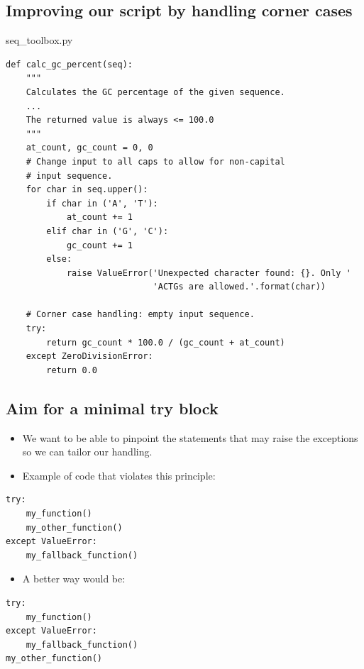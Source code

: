 \documentclass[aspectratio=1610,slidestop]{beamer}
\begin{document}
\subsection{Improving our script by handling corner cases}
\begin{pframe}
 \begin{pythonfile}{seq\_toolbox.py}
  \begin{tiny}
  \begin{verbatim}
def calc_gc_percent(seq):
    """
    Calculates the GC percentage of the given sequence.
    ...
    The returned value is always <= 100.0
    """
    at_count, gc_count = 0, 0
    # Change input to all caps to allow for non-capital
    # input sequence.
    for char in seq.upper():
        if char in ('A', 'T'):
            at_count += 1
        elif char in ('G', 'C'):
            gc_count += 1
        else:
            raise ValueError('Unexpected character found: {}. Only '
                             'ACTGs are allowed.'.format(char))

    # Corner case handling: empty input sequence.
    try:
        return gc_count * 100.0 / (gc_count + at_count)
    except ZeroDivisionError:
        return 0.0
  \end{verbatim}
  \end{tiny}
 \end{pythonfile}
\end{pframe}


\subsection{Aim for a minimal try block}
\begin{pframe}
 \vspace{-0.5cm}
 \begin{itemize}
  \item We want to be able to pinpoint the statements that may raise the
  exceptions so we can tailor our handling.
  \item Example of code that violates this principle:
 \end{itemize}
 \vspace{-0.3cm}
 \begin{pythoncode}
   \begin{verbatim}
try:
    my_function()
    my_other_function()
except ValueError:
    my_fallback_function()
   \end{verbatim}
  \end{pythoncode}
 \begin{itemize}
  \item A better way would be:
 \end{itemize}
 \vspace{-0.3cm}
 \begin{pythoncode}
   \begin{verbatim}
try:
    my_function()
except ValueError:
    my_fallback_function()
my_other_function()
   \end{verbatim}
  \end{pythoncode}
\end{pframe}
\end{document}
